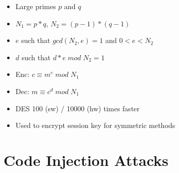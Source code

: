 \documentclass[11pt, paper=a4, twocolumn]{scrartcl}
\begin{document}
\begin{itemize}
\begin{itemize}
					\item Large primes $p$ and $q$
					\item $N_1 = p*q$, $N_2=(p-1)*(q-1)$
					\item $e$ such that $gcd(N_2,e) = 1$ and $0<e<N_2$
					\item $d$ such that $d*e\;mod\;N_2=1$
					\item Enc: $c\equiv m^e\;mod\;N_1$
					\item Dec: $m \equiv c^d\;mod\;N_1$
					\item DES 100 (sw) / 10000 (hw) times faster
					\item Used to encrypt session key for symmetric methods
				\end{itemize}
		\end{itemize}

	\section{Code Injection Attacks}
\end{document}
